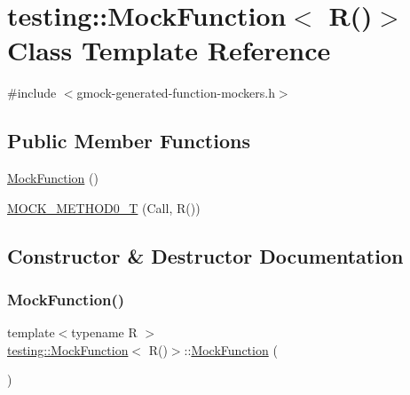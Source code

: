 \hypertarget{classtesting_1_1MockFunction_3_01R_07_08_4}{}\section{testing\+::Mock\+Function$<$ R()$>$ Class Template Reference}
\label{classtesting_1_1MockFunction_3_01R_07_08_4}


{\ttfamily \#include $<$gmock-\/generated-\/function-\/mockers.\+h$>$}

\subsection*{Public Member Functions}
\begin{DoxyCompactItemize}
\item 
\mbox{\hyperlink{classtesting_1_1MockFunction_3_01R_07_08_4_acc6a6896f7f4b116b04e00d5a2088347}{Mock\+Function}} ()
\item 
\mbox{\hyperlink{classtesting_1_1MockFunction_3_01R_07_08_4_a08e7016e3e060a5cd375b66ff0cc04e8}{M\+O\+C\+K\+\_\+\+M\+E\+T\+H\+O\+D0\+\_\+T}} (Call, R())
\end{DoxyCompactItemize}


\subsection{Constructor \& Destructor Documentation}
\mbox{\label{classtesting_1_1MockFunction_3_01R_07_08_4_acc6a6896f7f4b116b04e00d5a2088347}} 
\subsubsection{\texorpdfstring{MockFunction()}{MockFunction()}}
{\footnotesize\ttfamily template$<$typename R $>$ \\
\mbox{\hyperlink{classtesting_1_1MockFunction}{testing\+::\+Mock\+Function}}$<$ R()$>$\+::\mbox{\hyperlink{classtesting_1_1MockFunction}{Mock\+Function}} (\begin{DoxyParamCaption}{ }\end{DoxyParamCaption})\hspace{0.3cm}{\ttfamily [inline]}}



